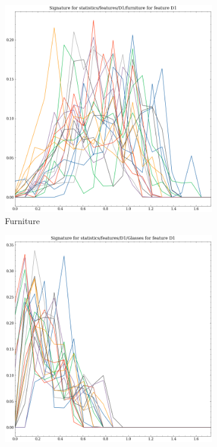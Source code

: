 \begin{figure}[t!p]
    \begin{subfigure}[b]{0.23\textwidth}
        \includegraphics[width=\textwidth]{assets/feature_extraction/D1/furniture.png}
        \caption{Furniture}
        \label{fig:features-statistics-D1-m}    
    \end{subfigure}
    \hfill
    \begin{subfigure}[b]{0.23\textwidth}
        \includegraphics[width=\textwidth]{assets/feature_extraction/D1/Glasses.png}

\end{subfigure}
\end{figure}

